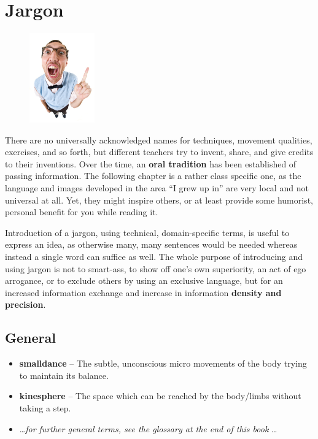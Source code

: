\chapter{Jargon}\label{ch:jargon}

\begin{figure}
    \centering
    \includegraphics[width=0.25\textwidth]{images/jargon}
\end{figure}

There are no universally acknowledged names for techniques, movement qualities, exercises, and so forth, but different teachers try to invent, share, and give credits to their inventions.
Over the time, an \textbf{oral tradition} has been established of passing information.
The following chapter is a rather class specific one, as the language and images developed in the area ``I grew up in'' are very local and not universal at all.
Yet, they might inspire others, or at least provide some humorist, personal benefit for you while reading it.

Introduction of a jargon, using technical, domain-specific terms, is useful to express an idea, as otherwise many, many sentences would be needed whereas instead a single word can suffice as well.
The whole purpose of introducing and using jargon is not to smart-ass, to show off one's own superiority, an act of ego arrogance, or to exclude others by using an exclusive language, but for an increased information exchange and increase in information \textbf{density and precision}.

\section{General}\label{sec:general}

\begin{itemize}
    \item [] \textbf{\Gls{smalldance}} -- The subtle, unconscious micro movements of the body trying to maintain its balance.
    \item [] \textbf{\Gls{kinesphere}} -- The space which can be reached by the body/limbs without taking a step.
    \item [] \ldots \textit{for further general terms, see the glossary at the end of this book} \ldots
\end{itemize}

